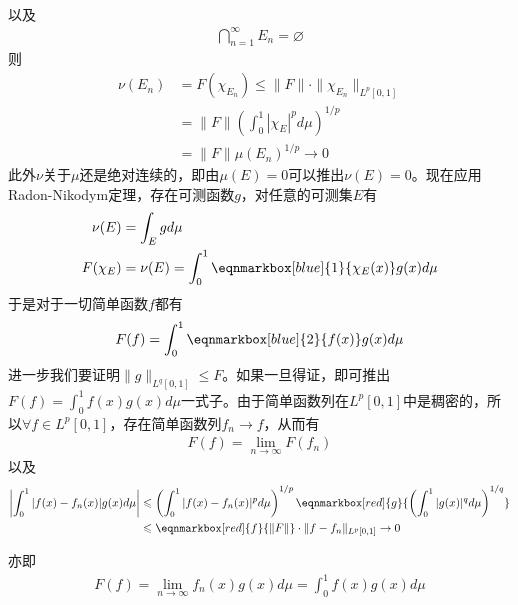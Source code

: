 \begin{enumerate}[leftmargin=2cm, label=\arabic*]
\begin{enumerate}[leftmargin=1cm, label=(\arabic*)]
\begin{align*}
			\end{align*}
			以及
			\begin{align*}
				\bigcap\limits_{n=1}^{\infty} E_n = \varnothing
			\end{align*}
			则
			\begin{align*}
				\nu(E_n) &= F(\chi_{E_n}) \leqslant \|F\| \cdot \|\chi_{E_n}\|_{L^p[0,1]} \\
				&= \|F\| \left(\int_0^1 |\chi_E|^p d\mu \right)^{1/p} \\
				& = \|F\| \mu(E_n)^{1/p} \to 0
			\end{align*}    
			此外$\nu$关于$\mu$还是绝对连续的，即由$\mu(E)=0$可以推出$\nu(E)=0$。现在应用Radon-Nikodym定理，存在可测函数$g$，对任意的可测集$E$有
			\begin{align*}
				\nu(E) &= \int_E gd\mu \\
				F(\chi_E) &= \nu(E) = \int_0^1 \eqnmarkbox[blue]{1}{\chi_E(x)}g(x)d\mu
			\end{align*}
			于是对于一切简单函数$f$都有
			\begin{align*}
				F(f) = \int_0^1 \eqnmarkbox[blue]{2}{f(x)}g(x)d\mu
			\end{align*}
			进一步我们要证明$\|g\|_{L^q[0,1]}\leqslant F$。如果一旦得证，即可推出$F(f)=\int_0^1f(x)g(x)d\mu$一式子。由于简单函数列在$L^p[0,1]$中是稠密的，所以$\forall f\in L^p[0,1]$，存在简单函数列$f_n\to f$，从而有
			\begin{align*}
				F(f) = \lim\limits_{n\to\infty} F(f_n)
			\end{align*}
			以及
			\begin{align*}
				\left|\int_0^1|f(x) - f_n(x)|g(x)d\mu \right| &\leqslant \left(\int_0^1|f(x) - f_n(x)|^p d\mu \right)^{1/p} \eqnmarkbox[red]{g}{\left(\int_0^1 |g(x)|^q d\mu \right)^{1/q}} \\
				&\leqslant \eqnmarkbox[red]{f}{\|F\|} \cdot \|f-f_n\|_{L^p[0,1]} \to 0
			\end{align*}
			
			\vspace{3em}
			亦即
			\begin{align*}
				F(f) = \lim\limits_{n\to\infty} f_n(x)g(x)d\mu = \int_0^1 f(x)g(x) d\mu
			\end{align*}
			

\end{enumerate}
\end{enumerate}
